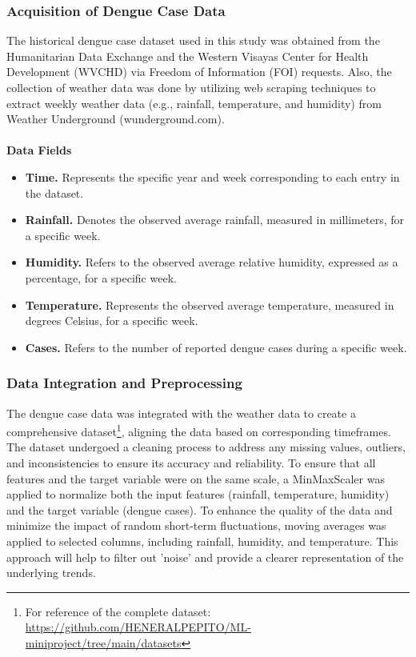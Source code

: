 \documentclass[runningheads]{llncs}
\begin{document}
\subsubsection{Acquisition of Dengue Case Data}
The historical dengue case dataset used in this study was obtained from the Humanitarian Data Exchange and the Western Visayas Center for Health Development (WVCHD) via Freedom of Information (FOI) requests. Also, the collection of weather data was done by utilizing web scraping techniques to extract weekly weather data (e.g., rainfall, temperature, and humidity) from Weather Underground (wunderground.com).
\\
\\
\textbf{Data Fields}
\begin{itemize}
    \item \textbf{Time.} Represents the specific year and week corresponding to each entry in the dataset.
    \item \textbf{Rainfall.} Denotes the observed average rainfall, measured in millimeters, for a specific week.
    \item \textbf{Humidity.} Refers to the observed average relative humidity, expressed as a percentage, for a specific week.    
    \item \textbf{Temperature.} Represents the observed average temperature, measured in degrees Celsius, for a specific week.
    \item \textbf{Cases.} Refers to the number of reported dengue cases during a specific week.
\end{itemize} 

\subsubsection{Data Integration and Preprocessing}
The dengue case data was integrated with the weather data to create a comprehensive dataset\footnote{For reference of the complete dataset:\\ 
	\url{https://github.com/HENERALPEPITO/ML-miniproject/tree/main/datasets}}, aligning the data based on corresponding timeframes. The dataset undergoed a cleaning process to address any missing values, outliers, and inconsistencies to ensure its accuracy and reliability. To ensure that all features and the target variable were on the same scale, a MinMaxScaler was applied to normalize both the input features (rainfall, temperature, humidity) and the target variable (dengue cases). To enhance the quality of the data and minimize the impact of random short-term fluctuations, moving averages was applied to selected columns, including rainfall, humidity, and temperature. This approach will help to filter out 'noise' and provide a clearer representation of the underlying trends.
\end{document}
